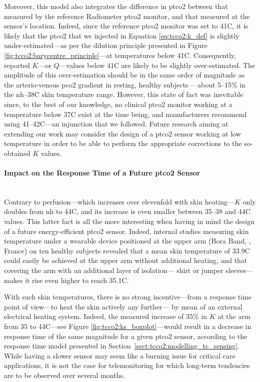 Moreover, this model also integrates the difference in \gls{ptco2} between that measured by the reference Radiometer \gls{ptco2} monitor, and that measured at the sensor's location. Indeed, since the reference \gls{ptco2} monitor was set to 41{\degree}C, it is likely that the \gls{ptco2} that we injected in Equation \ref{eq:tcco2:k_def} is slightly under-estimated---as per the dilution principle presented in Figure \ref{fig:tcco2:barycentre_principle}---at temperatures below 41{\degree}C. Consequently, reported $K$---or $Q$---values below 41{\degree}C are likely to be slightly over-estimated. The amplitude of this over-estimation should be in the same order of magnitude as the arterio-venous \gls{pco2} gradient in resting, healthy subjects---\ie{} about 5--15\% in the \gls{nh}--38{\degree}C skin temperature range\cite{kowalchuk1988, schneider2013}. \mfrin{}However, this state of fact was inevitable since, to the best of our knowledge, no clinical \gls{ptco2} monitor working at a temperature below 37{\degree}C exist at the time being, and manufacturers recommend using 41--42{\degree}C---an injunction that we followed. Future research aiming at extending our work may consider the design of a \gls{ptco2} sensor working at low temperature in order to be able to perform the appropriate corrections to the so-obtained $K$ values.

\paragraph{Impact on the Response Time of a Future \texorpdfstring{\gls{ptco2}}{tcpCO2} Sensor}\label{subsect:tcco2:future_rt}\mbox{}\\

Contrary to perfusion---which increases over elevenfold with skin heating---$K$ only doubles from \gls{nh} to 44{\degree}C, and its increase is even smaller between 35--38 and 44{\degree}C values. This latter fact is all the more interesting when having in mind the design of a future energy-efficient \gls{ptco2} sensor. Indeed, internal studies measuring skin temperature under a wearable device positioned at the upper arm (Bora Band, \bscy{}, France) on ten healthy subjects revealed that a mean skin temperature of 33.9{\degree}C could easily be achieved at the upper arm without additional heating, and that covering the arm with an additional layer of isolation---\ie{} shirt or jumper sleeves---makes it rise even higher to reach 35.1{\degree}C.

With such skin temperatures, there is no strong incentive---from a response time point of view---to heat the skin actively any further---\ie{} by mean of an external electrical heating system. Indeed, the measured increase of 35\% in $K$ at the arm from 35 to 44{\degree}C---see Figure \ref{fig:tcco2:ks_boxplot}---would result in a decrease in response time of the same magnitude for a given \gls{ptco2} sensor, according to the response time model presented in Section~\ref{sect:tcco2:modelling_tc_sensing}. While having a slower sensor may seem like a burning issue for critical care applications, it is not the case for telemonitoring for which long-term tendencies are to be observed over several months\cite{jang2021}.

